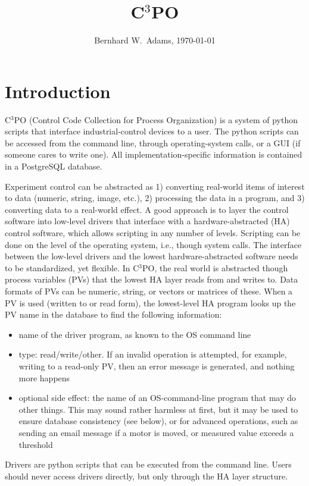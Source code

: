\documentclass[10pt]{revtex4}
\def\C3PO{{C$^3$PO}}
\begin{document}
\title{C$^3$PO}
\vspace{4mm}
\par
\author{Bernhard W.\ Adams, \today}
\maketitle
\section{Introduction}
\label{s_intro}
\C3PO (Control Code Collection for Process Organization) is a 
system of python scripts that interface industrial-control devices
to a user.
The python scripts can be accessed from the command line, through
operating-system calls, or a GUI (if someone cares to write one).
All implementation-specific information is contained in a PostgreSQL
database.
\par
Experiment control can be abstracted as 1) converting real-world items
of interest to data (numeric, string, image, etc.), 2) processing the
data in a program, and 3) converting data to a real-world effect.
A good approach is to layer the control software into low-level drivers
that interface with a hardware-abstracted (HA) control software, which
allows scripting in any number of levels.
Scripting can be done on the level of the operating system, i.e.,
though system calls.
The interface between the low-level drivers and the lowest
hardware-abstracted software needs to be standardized, yet flexible.
In C$^3$PO, the real world is abstracted though process variables (PVs)
that the lowest HA layer reads from and writes to.
Data formats of PVs can be numeric, string, or vectors or matrices of these.
When a PV is used (written to or read form), the lowest-level HA
program looks up the PV name in the database to find the following
information:
\begin{itemize}
\item name of the driver program, as known to the OS command line
\item type: read/write/other. If an invalid operation is attempted,
for example, writing to a read-only PV,
then an error message is generated, and nothing more happens
\item optional side effect: the name of an OS-command-line program
that may do other things. This may sound rather harmless at first,
but it may be used to
ensure database consistency (see below), or for advanced operations,
such as sending an email message if a motor is moved, or measured
value exceeds a threshold
\end{itemize}
\par
Drivers are python scripts that can be executed from the command line.
Users should never access drivers directly, but only through
the HA layer structure.
\end{document}
